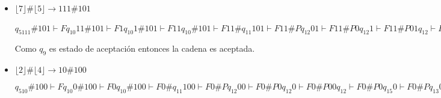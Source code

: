 \documentclass[12pt,letterpaper]{article}
\begin{document}
\begin{itemize}
    \item $\lfloor 7 \rfloor \# \lfloor 5 \rfloor \longrightarrow 111 \# 101$
    
    $q_5111\#101 \vdash Fq_{10}11\#101 \vdash F1q_{10}1\#101 \vdash F11q_{10}\#101 \vdash F11\#q_{11}101 \vdash F11\#Pq_{12}01 \vdash F11\#P0q_{12}1 \vdash F11\#P01q_{12} \vdash F11\#P0q_{15}1 \vdash F11\#Pq_{13}01 \vdash F11\#q_{13}P01 \vdash F11q_{13}\#P01 \vdash F1q_{13}1\#P01 \vdash Fq_{13}11\#P01 \vdash q_{13}F11\#P01 \vdash Fq_{5}11\#P01 \vdash FFq_{10}1\#P01 \vdash FF1q_{10}\#P01 \vdash FF1\#q_{11}P01 \vdash FF1\#Pq_{11}01 \vdash FF1\#PBq_{12}1 \vdash FF1\#PB1q_{12} \vdash FF1\#PBq_{15}1 \vdash FF1\#Pq_{13}B1 \vdash FF1\#q_{13}PB1 \vdash FF1q_{13}\#PB1 \vdash FFq_{13}1\#PB1 \vdash Fq_{13}F1\#PB1 \vdash FFq_{5}1\#PB1 \vdash FFFq_{10}\#PB1 \vdash FFF\#q_{11}PB1 \vdash FFF\#Pq_{11}B1 \vdash FFF\#PBq_{11}1 \vdash FFF\#PBPq_{12} \vdash FFF\#PBq_{15}P \vdash FFF\#PBPq_{14} \vdash FFF\#PBq_{16}P \vdash^* q_{16}\_111\#101 \vdash q_0111\#101 \vdash Xq_211\#101 \vdash X1q_21\#101 \vdash X1q_21\#101 \vdash X11q_2\#101 \vdash X11\#q_4101 \vdash X11\#Yq_601 \vdash X11\#Y0q_61 \vdash X11\#Y01q_6 \vdash X11\#Y0q_71 \vdash X11\#Yq_801 \vdash X11\#q_8Y01 \vdash X11q_8\#Y01 \vdash X1q_81\#Y01 \vdash Xq_811\#Y01 \vdash q_8X11\#Y01 \vdash Xq_011\#Y01 \vdash XXq_21\#Y01 \vdash XX1q_2\#Y01 \vdash XX1\#q_4Y01 \vdash XX1\#Yq_401 \vdash XX1\#YYq_61 \vdash XX1\#YY1q_6 \vdash XX1\#YYq_71 \vdash XX1\#Yq_8Y1 \vdash XX1\#q_8YY1 \vdash XX1q_8\#YY1 \vdash XXq_81\#YY1 \vdash Xq_8X1\#YY1 \vdash XXq_01\#YY1 \vdash XXXq_2\#YY1 \vdash XXX\#q_4YY1 \vdash XXX\#Yq_4Y1 \vdash XXX\#YYq_41 \vdash XXX\#YYYq_6 \vdash XXX\#YYq_7Y \vdash XXX\#YYYq_9$
    
    Como $q_9$ es estado de aceptación entonces la cadena es aceptada.
    
    \item $\lfloor 2 \rfloor \# \lfloor 4 \rfloor \longrightarrow 10 \# 100$
    
    $q_510\#100 \vdash Fq_{10}0\#100 \vdash F0q_{10}\#100 \vdash F0\#q_{11}100 \vdash F0\#Pq_{12}00 \vdash F0\#P0q_{12}0 \vdash F0\#P00q_{12} \vdash F0\#P0q_{15}0 \vdash F0\#Pq_{13}00 \vdash F0\#q_{13}P00 \vdash F0q_{13}\#P00 \vdash Fq_{13}0\#P00 \vdash q_{13}F0\#P00 \vdash Fq_{5}0\#P00 \vdash FAq_{10}\#P00 \vdash FA\#q_{11}P00 \vdash FA\#Pq_{11}00 \vdash FA\#PBq_{12}0 \vdash FA\#PB0q_{12} \vdash FA\#PBq_{15}0 \vdash FA\#Pq_{13}B0 \vdash FA\#q_{13}PB0 \vdash FAq_{13}\#PB0 \vdash Fq_{13}A\#PB0 \vdash FAq_5\#PB0$
    

\end{itemize}
\end{document}
